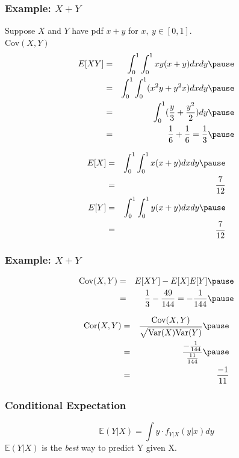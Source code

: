 \documentclass[handout]{beamer}
\numberwithin{equation}{section}
\begin{document}
\begin{frame}
\frametitle{Example: $X + Y$} 
Suppose $X$ and $Y$ have pdf $x + y$ for $x,\ y \in [0,1]$.  \pause \\
Cov$(X,Y)$  \pause 
\begin{eqnarray}
E[XY] & = & \int_{0}^{1} \int_{0}^{1} xy (x + y) dx dy \nonumber  \pause \\
& = & \int_{0}^{1} \int_{0}^{1} (x^2 y + y^2 x) dx dy \nonumber  \pause \\
& = & \int_{0}^{1} (\frac{y}{3} + \frac{y^2}{2} ) dy \nonumber  \pause \\
& = & \frac{1}{6} + \frac{1}{6} = \frac{1}{3} \nonumber \pause  
\end{eqnarray}

\begin{eqnarray}
E[X] & = & \int_{0}^{1} \int_{0}^{1} x (x + y) dxdy \nonumber  \pause \\
 & = & \frac{7}{12} \nonumber   \\
E[Y] & = & \int_{0}^{1} \int_{0}^{1} y(x + y) dxdy \nonumber \pause \\
 & = & \frac{7}{12} \nonumber  
 \end{eqnarray}


\end{frame}




\begin{frame}
\frametitle{Example: $X + Y$ } 

\begin{eqnarray}
\text{Cov}(X,Y) & = &  E[XY] - E[X]E[Y] \nonumber  \pause \\
& = & \frac{1}{3}  - \frac{49}{144} = -\frac{1}{144} \nonumber  \pause 
\end{eqnarray}

\begin{eqnarray}
\text{Cor}(X,Y) & = & \frac{\text{Cov}(X,Y)}{\sqrt{\text{Var}(X) \text{Var}(Y) }} \nonumber  \pause \\
& = & \frac{- \frac{1}{144}}{\frac{11}{144}} \nonumber \pause  \\
& = & \frac{-1}{11} \nonumber 
\end{eqnarray}


\end{frame}


\begin{frame}
\frametitle{Conditional Expectation}
$$\mathbb{E}(Y|X)=\int y\cdot f_{Y|X} (y|x)dy $$
$\mathbb{E}(Y|X)$ is the \emph{best} way to predict Y given X.

\end{frame}
\end{document}
